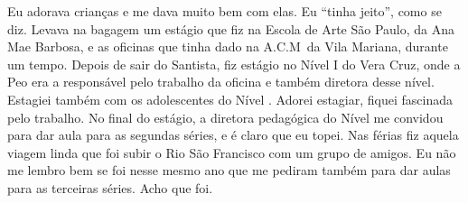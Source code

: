 Eu adorava crianças e me dava muito bem com elas. Eu ``tinha jeito'',
como se diz. Levava na bagagem um estágio que fiz na Escola de Arte São
Paulo, da Ana Mae Barbosa, e as oficinas que tinha dado na A.C.M\, da
Vila Mariana, durante um tempo. Depois de sair do Santista, fiz estágio
no Nível I do Vera Cruz, onde a Peo era a responsável pelo trabalho da
oficina e também diretora desse nível. Estagiei também com os
adolescentes do Nível . Adorei estagiar, fiquei fascinada pelo
trabalho. No final do estágio, a diretora pedagógica do Nível  me
convidou para dar aula para as segundas séries, e é claro que eu topei.
Nas férias fiz aquela viagem linda que foi subir o Rio São Francisco com
um grupo de amigos. Eu não me lembro bem se foi nesse mesmo ano que me
pediram também para dar aulas para as terceiras séries. Acho que foi.

